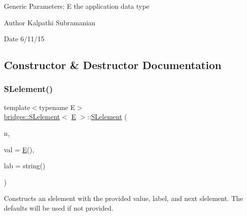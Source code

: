 Generic Parameters\+: E the application data type

\begin{DoxyAuthor}{Author}
Kalpathi Subramanian 
\end{DoxyAuthor}
\begin{DoxyDate}{Date}
6/11/15 
\end{DoxyDate}


\subsection{Constructor \& Destructor Documentation}
\mbox{\label{classbridges_1_1_s_lelement_a9ddac46a935b85cde76305135d16de0a}} 
\subsubsection{\texorpdfstring{SLelement()}{SLelement()}\hspace{0.1cm}{\footnotesize\ttfamily [1/2]}}
{\footnotesize\ttfamily template$<$typename E$>$ \\
\mbox{\hyperlink{classbridges_1_1_s_lelement}{bridges\+::\+S\+Lelement}}$<$ \mbox{\hyperlink{namespacebridges_acfb0a4f7877d8f63de3e6862004c50eda3a3ea00cfc35332cedf6e5e9a32e94da}{E}} $>$\+::\mbox{\hyperlink{classbridges_1_1_s_lelement}{S\+Lelement}} (\begin{DoxyParamCaption}\item[{\mbox{\hyperlink{classbridges_1_1_s_lelement}{S\+Lelement}}$<$ \mbox{\hyperlink{namespacebridges_acfb0a4f7877d8f63de3e6862004c50eda3a3ea00cfc35332cedf6e5e9a32e94da}{E}} $>$ $\ast$}]{n,  }\item[{const \mbox{\hyperlink{namespacebridges_acfb0a4f7877d8f63de3e6862004c50eda3a3ea00cfc35332cedf6e5e9a32e94da}{E}} \&}]{val = {\ttfamily \mbox{\hyperlink{namespacebridges_acfb0a4f7877d8f63de3e6862004c50eda3a3ea00cfc35332cedf6e5e9a32e94da}{E}}()},  }\item[{const string \&}]{lab = {\ttfamily string()} }\end{DoxyParamCaption})\hspace{0.3cm}{\ttfamily [inline]}}

Constructs an slelement with the provided value, label, and next slelement. The defaults will be used if not provided.


